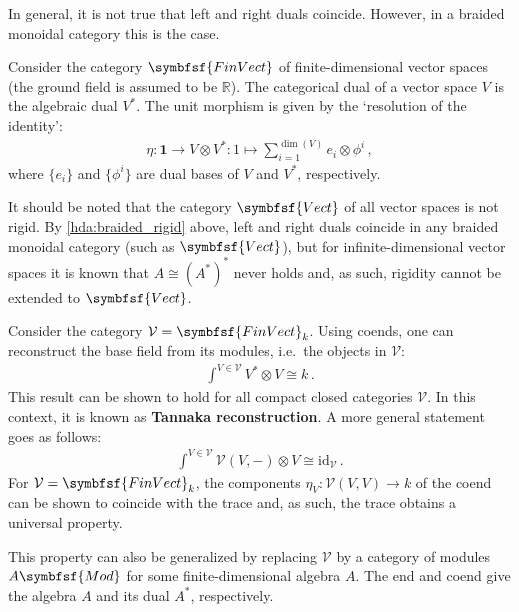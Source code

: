     \begin{property}\label{hda:braided_rigid}
        In general, it is not true that left and right duals coincide. However, in a braided monoidal category this is the case.
    \end{property}


    \begin{example}[FinVect]
        Consider the category $\symbfsf{FinVect}$ of finite-dimensional vector spaces (the ground field is assumed to be $\mathbb{R}$). The categorical dual of a vector space $V$ is the algebraic dual $V^*$. The unit morphism is given by the `resolution of the identity':
        \begin{gather}
            \eta:\symbf{1}\rightarrow V\otimes V^*:1\mapsto\sum_{i=1}^{\dim(V)}e_i\otimes\phi^i\,,
        \end{gather}
        where $\{e_i\}$ and $\{\phi^i\}$ are dual bases of $V$ and $V^*$, respectively.

        It should be noted that the category $\symbfsf{Vect}$ of all vector spaces is not rigid. By \cref{hda:braided_rigid} above, left and right duals coincide in any braided monoidal category (such as $\symbfsf{Vect}$), but for infinite-dimensional vector spaces it is known that $A\cong(A^*)^*$ never holds and, as such, rigidity cannot be extended to $\symbfsf{Vect}$.
    \end{example}

    \begin{property}
        Consider the category $\mathcal{V}=\symbfsf{FinVect}_k$. Using coends, one can reconstruct the base field from its modules, i.e.~the objects in $\mathcal{V}$:
        \begin{gather}
            \int^{V\in\mathcal{V}}V^*\otimes V\cong k\,.
        \end{gather}
        This result can be shown to hold for all compact closed categories $\mathcal{V}$. In this context, it is known as \textbf{Tannaka reconstruction}. A more general statement goes as follows:
        \begin{gather}
            \int^{V\in\mathcal{V}}\mathcal{V}(V,-)\otimes V\cong\mathrm{id}_{\mathcal{V}}\,.
        \end{gather}
        For $\mathcal{V}=\symbfsf{FinVect}_k$, the components $\eta_V:\mathcal{V}(V,V)\rightarrow k$ of the coend can be shown to coincide with the trace and, as such, the trace obtains a universal property.
    \end{property}
    \begin{remark}
        This property can also be generalized by replacing $\mathcal{V}$ by a category of modules $A\symbfsf{Mod}$ for some finite-dimensional algebra $A$. The end and coend give the algebra $A$ and its dual $A^*$, respectively.
    \end{remark}

